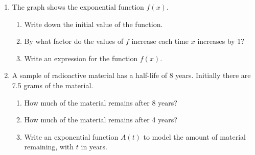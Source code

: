 \documentclass[12pt, twoside]{article}
\begin{document}
\begin{enumerate}
\newpage
\item The graph shows the exponential function $\displaystyle f(x)$.
\begin{multicols}{2}
    \begin{enumerate}[itemsep=1cm]
        \item Write down the initial value of the function.
        \item By what factor do the values of $f$ increase each time $x$ increases by 1?
        \item Write an expression for the function $f(x)$.
    \end{enumerate}
    \begin{center}
    \end{center}
    \end{multicols} \vspace{1cm}

\item A sample of radioactive material has a half-life of 8 years. Initially there are 7.5 grams of the material.
    \begin{enumerate}[itemsep=2cm]
        \item How much of the material remains after 8 years?
        \item How much of the material remains after 4 years?
        \item Write an exponential function $A(t)$ to model the amount of material remaining, with $t$ in years.
    \end{enumerate}

\end{enumerate}
\end{document}
